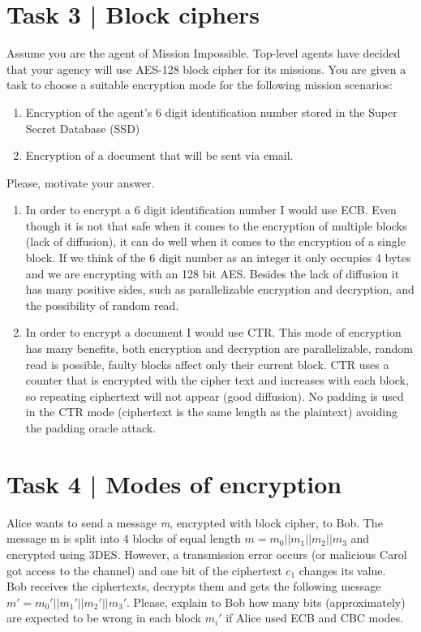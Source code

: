 \documentclass{article}
\begin{document}
\section*{Task 3 | Block ciphers}
Assume you are the agent of Mission Impossible. Top-level agents have decided that your
agency will use AES-128 block cipher for its missions. You are given a task to choose a 
suitable encryption mode for the following mission scenarios:
\begin{enumerate}
    \item Encryption of the agent's 6 digit identification number stored in the 
        Super Secret Database (SSD)
    \item Encryption of a document that will be sent via email.
\end{enumerate}
Please, motivate your answer.
\begin{enumerate}
    \item In order to encrypt a 6 digit identification number I would use ECB. Even though
        it is not that safe when it comes to the encryption of multiple blocks (lack of diffusion), 
        it can do well when it comes to the encryption of a single block. If we think of the 6 digit
        number as an integer it only occupies 4 bytes and we are encrypting with an 128 bit
        AES. Besides the lack of diffusion it has many positive sides, such as parallelizable
        encryption and decryption, and the possibility of random read.
    \item In order to encrypt a document I would use CTR. This mode of encryption has 
        many benefits, both encryption and decryption are parallelizable, random read is possible,
        faulty blocks affect only their current block.
        CTR uses a counter that is encrypted with the cipher text and increases 
        with each block, so repeating ciphertext will not appear (good diffusion). No padding is used 
        in the CTR mode (ciphertext is the same length as the plaintext) avoiding the padding oracle attack.
\end{enumerate}


\section*{Task 4 | Modes of encryption}
Alice wants to send a message \textit{m}, encrypted with block cipher, to Bob. The message m
is split into 4 blocks of equal length $m = m_0||m_1||m_2||m_3$ and encrypted using 3DES.
However, a transmission error occurs (or malicious Carol got access to the channel) and
one bit of the ciphertext $c_1$ changes its value. \\
Bob receives the ciphertexts, decrypts them and gets the following message 
$m' = m_0'||m_1'||m_2'||m_3'$. 
Please, explain to Bob how many bits (approximately) are expected to
be wrong in each block $m_i'$ if Alice used ECB and CBC modes.
\end{document}
